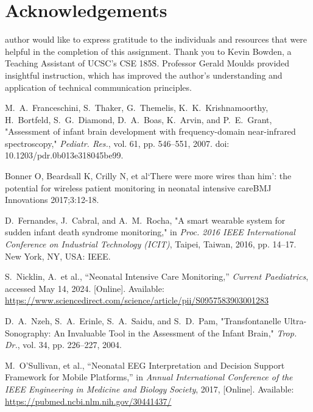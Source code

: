 \documentclass[12pt,journal,compsoc]{IEEEtran}
\begin{document}
\section*{Acknowledgements}
 author would like to express gratitude to the individuals and resources that were helpful in the completion of this assignment. Thank you to Kevin Bowden, a Teaching Assistant of UCSC's CSE 185S. Professor Gerald Moulds provided insightful instruction, which has improved the author's understanding and application of technical communication principles.


\begin{thebibliography}{1}

M.~A.~Franceschini, S.~Thaker, G.~Themelis, K.~K.~Krishnamoorthy, H.~Bortfeld, S.~G.~Diamond, D.~A.~Boas, K.~Arvin, and P.~E.~Grant, "Assessment of infant brain development with frequency-domain near-infrared spectroscopy," \emph{Pediatr. Res.}, vol. 61, pp. 546–551, 2007. doi: 10.1203/pdr.0b013e318045be99.

Bonner O, Beardsall K, Crilly N, et al‘There were more wires than him’: the potential for wireless patient monitoring in neonatal intensive careBMJ Innovations 2017;3:12-18.

D.~Fernandes, J.~Cabral, and A.~M.~Rocha, "A smart wearable system for sudden infant death syndrome monitoring," in \emph{Proc. 2016 IEEE International Conference on Industrial Technology (ICIT)}, Taipei, Taiwan, 2016, pp. 14–17. New York, NY, USA: IEEE. 

S.~Nicklin, A.~et al., “Neonatal Intensive Care Monitoring,” \emph{Current Paediatrics}, accessed May 14, 2024. [Online]. Available: \url{https://www.sciencedirect.com/science/article/pii/S0957583903001283}

D.~A.~Nzeh, S.~A.~Erinle, S.~A.~Saidu, and S.~D.~Pam, "Transfontanelle Ultra-Sonography: An Invaluable Tool in the Assessment of the Infant Brain," \emph{Trop. Dr.}, vol. 34, pp. 226–227, 2004.

M.~O’Sullivan, et al., “Neonatal EEG Interpretation and Decision Support Framework for Mobile Platforms,” in \emph{Annual International Conference of the IEEE Engineering in Medicine and Biology Society}, 2017, [Online]. Available: \url{https://pubmed.ncbi.nlm.nih.gov/30441437/}


\end{thebibliography}
\end{document}
